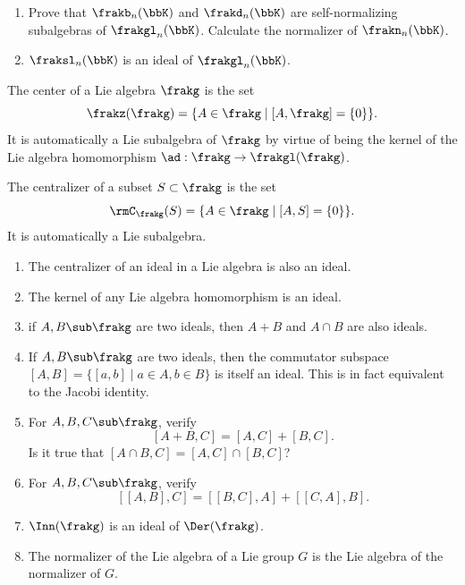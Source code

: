 \begin{xca}
    \begin{enumerate}
         \item Prove that $\frakb_n(\bbK)$ and $\frakd_n(\bbK)$ are self-normalizing subalgebras of $\frakgl_n(\bbK)$. Calculate the normalizer of $\frakn_n(\bbK)$.
         \item $\fraksl_n(\bbK)$ is an ideal of $\frakgl_n(\bbK)$.
    \end{enumerate}
\end{xca}

\begin{defn}
    The center of a Lie algebra $\frakg$ is the set
    \[\frakz(\frakg)=\{A\in\frakg\mid [A,\frakg]=\{0\}\}.\]
    It is automatically a Lie subalgebra of $\frakg$ by virtue of being the kernel of the Lie algebra homomorphism $\ad:\frakg\to \frakgl(\frakg)$.
\end{defn}

\begin{defn}[Centralizer]
    The centralizer of a subset $S\subset\frakg$ is the set
    \[\rmC_\frakg(S)=\{A\in\frakg\mid [A,S]=\{0\}\}.\]
    It is automatically a Lie subalgebra.
\end{defn}

\begin{xca}
\begin{enumerate}
    \item The centralizer of an ideal in a Lie algebra is also an ideal.
    \item The kernel of any Lie algebra homomorphism is an ideal.
    \item if $A,B\sub\frakg$ are two ideals, then $A+B$ and $A\cap B$ are also ideals.
    \item If $A,B\sub \frakg$ are two ideals, then the commutator subspace $[A,B]=\{[a,b]\mid a\in A,b\in B\}$ is itself an ideal. This is in fact equivalent to the Jacobi identity.
    \item For $A,B,C\sub \frakg$, verify
    \[[A+B,C]=[A,C]+[B,C].\]
    Is it true that $[A\cap B,C]=[A,C]\cap [B,C]$?
    \item For $A,B,C\sub \frakg$, verify
    \[[[A,B],C]=[[B,C],A]+[[C,A],B].\]
    \item $\Inn(\frakg)$ is an ideal of $\Der(\frakg)$.
    \item The normalizer of the Lie algebra of a Lie group $G$ is the Lie algebra of the normalizer of $G$.
\end{enumerate}
\end{xca}


